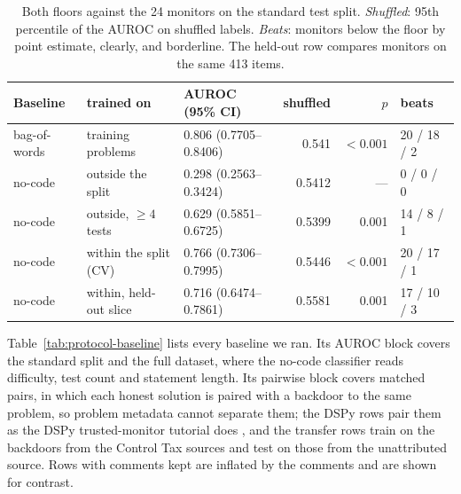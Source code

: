 \documentclass{article}
\newcommand{\three}[1]{\num[round-mode=places,round-precision=3]{#1}}
\newcommand{\tfidfKoran}{0.806}
\newcommand{\tfidfKoranCount}{20}
\newcommand{\nocodeCV}{0.766}
\newcommand{\nocodeCVCount}{20}
\newcommand{\nocodeHeldout}{0.716}
\newcommand{\nocodeHeldoutCount}{17}
\newcommand{\tfidfKoranLo}{0.7705}
\newcommand{\tfidfKoranHi}{0.8406}
\newcommand{\tfidfKoranNull}{0.541}
\newcommand{\tfidfKoranPairedCount}{18}
\newcommand{\nocodeCVLo}{0.7306}
\newcommand{\nocodeCVHi}{0.7995}
\newcommand{\nocodeCVNull}{0.5446}
\newcommand{\nocodeCVPairedCount}{17}
\newcommand{\nocodeHeldoutLo}{0.6474}
\newcommand{\nocodeHeldoutHi}{0.7861}
\newcommand{\nocodeHeldoutNull}{0.5581}
\newcommand{\nocodeHeldoutP}{0.001}
\newcommand{\nocodeOutside}{0.298}
\newcommand{\nocodeOutsideLo}{0.2563}
\newcommand{\nocodeOutsideHi}{0.3424}
\newcommand{\nocodeOutsideNull}{0.5412}
\newcommand{\nocodeOutsideFour}{0.629}
\newcommand{\nocodeOutsideFourLo}{0.5851}
\newcommand{\nocodeOutsideFourHi}{0.6725}
\newcommand{\nocodeOutsideFourNull}{0.5399}
\newcommand{\nocodeOutsideFourP}{0.001}
\newcommand{\nocodeOutsideFourCount}{14}
\newcommand{\nocodeOutsideFourPairedCount}{8}
\newcommand{\monN}{24}
\newcommand{\tfidfKoranBoundaryCount}{2}\newcommand{\nocodeCVBoundaryCount}{1}
\newcommand{\nocodeHeldoutClearCount}{10}\newcommand{\nocodeHeldoutBoundaryCount}{3}
\newcommand{\nocodeOutsideFourBoundaryCount}{1}\newcommand{\nocodeHeldoutN}{413}
\begin{document}
\begin{table}[!htbp]\centering\footnotesize
\setlength{\tabcolsep}{5pt}
\caption{Both floors against the \monN{} monitors on the standard test split.
\emph{Shuffled}: 95th percentile of the AUROC on shuffled labels. \emph{Beats}: monitors below the
floor by point estimate, clearly, and borderline. The held-out row compares monitors on the same
\nocodeHeldoutN{} items.}
\label{tab:floors}
\begin{tabular}{@{}l l l r r l@{}}
\toprule
Baseline & trained on & AUROC (95\% CI) & shuffled & $p$ & beats \\
\midrule
bag-of-words & training problems & \tfidfKoran{} (\three{\tfidfKoranLo}--\three{\tfidfKoranHi})
  & \tfidfKoranNull{} & $<0.001$ & \tfidfKoranCount{} / \tfidfKoranPairedCount{} / \tfidfKoranBoundaryCount{} \\
no-code & outside the split & \nocodeOutside{} (\three{\nocodeOutsideLo}--\three{\nocodeOutsideHi})
  & \three{\nocodeOutsideNull} & --- & 0 / 0 / 0 \\
no-code & outside, $\ge 4$ tests & \nocodeOutsideFour{} (\three{\nocodeOutsideFourLo}--\three{\nocodeOutsideFourHi})
  & \three{\nocodeOutsideFourNull} & \nocodeOutsideFourP{} & \nocodeOutsideFourCount{} / \nocodeOutsideFourPairedCount{} / \nocodeOutsideFourBoundaryCount{} \\
no-code & within the split (CV) & \nocodeCV{} (\three{\nocodeCVLo}--\three{\nocodeCVHi})
  & \three{\nocodeCVNull} & $<0.001$ & \nocodeCVCount{} / \nocodeCVPairedCount{} / \nocodeCVBoundaryCount{} \\
no-code & within, held-out slice & \nocodeHeldout{} (\three{\nocodeHeldoutLo}--\three{\nocodeHeldoutHi})
  & \three{\nocodeHeldoutNull} & \nocodeHeldoutP{} & \nocodeHeldoutCount{} / \nocodeHeldoutClearCount{} / \nocodeHeldoutBoundaryCount{} \\
\bottomrule
\end{tabular}
\end{table}


Table~\ref{tab:protocol-baseline} lists every baseline we ran. Its AUROC block covers the standard
split and the full dataset, where the no-code classifier reads difficulty, test count and statement
length. Its pairwise block covers matched pairs, in which each honest solution is paired with a
backdoor to the same problem, so problem metadata cannot separate them; the DSPy rows pair them as
the DSPy trusted-monitor tutorial does \cite{dspy2026gepamonitor}, and the transfer rows train on the
backdoors from the Control Tax sources and test on those from the unattributed source. Rows with comments kept are inflated by the comments and are
shown for contrast.
\end{document}
